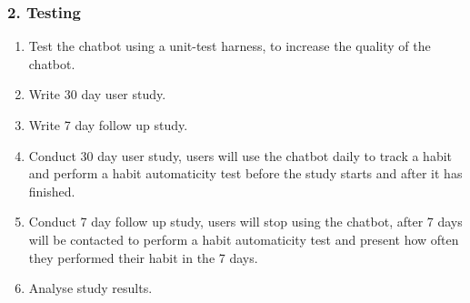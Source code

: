 \subsubsection*{2. Testing}

\begin{enumerate}
 \item Test the chatbot using a unit-test harness, to increase the quality of the chatbot.
 \item Write 30 day user study.
 \item Write 7 day follow up study.
 \item Conduct 30 day user study, users will use the chatbot daily to track a habit and perform a habit automaticity test before the study starts and after it has finished.
 \item Conduct 7 day follow up study, users will stop using the chatbot, after 7 days will be contacted to perform a habit automaticity test and present how often they performed their habit in the 7 days.
 \item Analyse study results.
\end{enumerate}

